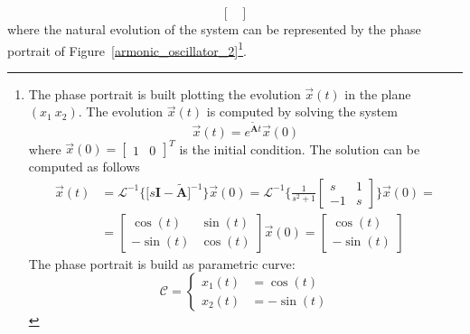 \documentclass[12pt,a4paper,oneside]{book}
\begin{document}
\begin{onehalfspace}
\begin{example}
\begin{equation}
\begin{bmatrix}
		\end{bmatrix}
	\end{equation}
	where the natural evolution of the system can be represented by the phase 
	portrait of Figure~\ref{armonic_oscillator_2}\footnote{The phase portrait is built plotting the evolution $\vec{x}(t)$ in the plane $(x_1\ x_2)$. The evolution $\vec{x}(t)$ is computed by solving the system
		\begin{equation}
			\vec{x}(t) = e^{\tilde{\mathbf{A}}t}\vec{x}(0)
		\end{equation}
		where $\vec{x}(0)=\begin{bmatrix}
			1&0
		\end{bmatrix}^T$ is the initial condition. The solution can be computed as follows
		\begin{equation}
			\begin{aligned}
				\vec{x}(t) &= 
				\mathcal{L}^{-1}\Big\{\Big[s\mathbf{I}-\tilde{\mathbf{A}}\Big]^{-1}\Big\}\vec{x}(0)
				= \mathcal{L}^{-1}\Bigg\{\frac{1}{s^2+1}\begin{bmatrix} s & 1 \\[6pt] -1 & s 
				\end{bmatrix}\Bigg\}\vec{x}(0) = \\[6pt]
				&= \begin{bmatrix} \cos(t) & \sin(t) \\[6pt] -\sin(t) & \cos(t) \end{bmatrix}\vec{x}(0) = \begin{bmatrix} \cos(t) \\[6pt] -\sin(t) \end{bmatrix}
			\end{aligned}
		\end{equation}
		The phase portrait is build as parametric curve:
		\begin{equation}
			\mathcal{C}=\left\lbrace \begin{aligned}
				x_1(t)&=\cos(t) \\[6pt]
				x_2(t)&=-\sin(t) 
			\end{aligned}\right. 
		\end{equation}
	}. 
	

\end{example}
\end{onehalfspace}
\end{document}
